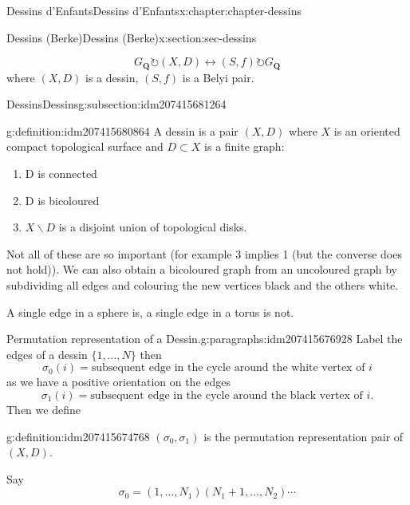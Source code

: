 \documentclass[oneside,10pt,]{book}
\numberwithin{equation}{section}
\newcommand{\QQ}{\mathbf{Q}}
\newcommand{\acts}{\circlearrowright}
\begin{document}
\begin{chapterptx}{Dessins d'Enfants}{}{Dessins d'Enfants}{}{}{x:chapter:chapter-dessins}
\begin{sectionptx}{Dessins (Berke)}{}{Dessins (Berke)}{}{}{x:section:sec-dessins}
\begin{introduction}{}%
%
\begin{equation*}
G_\QQ \acts (X,D) \leftrightarrow (S,f) \acts G_\QQ
\end{equation*}
where \((X,D)\) is a dessin, \((S,f)\) is a Belyi pair.%
\end{introduction}%
%
%
\typeout{************************************************}
\typeout{************************************************}
%
\begin{subsectionptx}{Dessins}{}{Dessins}{}{}{g:subsection:idm207415681264}
\begin{definition}{}{g:definition:idm207415680864}%
A dessin is  a pair \((X,D)\) where \(X\) is an oriented compact topological surface and \(D\subset X\) is a finite graph:%
\begin{enumerate}
\item{}D is connected%
\item{}D is bicoloured%
\item{}\(X \smallsetminus D\) is a disjoint union of topological disks.%
\end{enumerate}
%
\end{definition}
Not all of these are so important (for example 3 implies 1 (but the converse does not hold)). We can also obtain a bicoloured graph from an uncoloured graph by subdividing all edges and colouring the new vertices black and the others white.%
\par
A single edge in a sphere is, a single edge in a torus is not.%
\begin{paragraphs}{Permutation representation of a Dessin.}{g:paragraphs:idm207415676928}%
Label the edges of  a dessin \(\{1, \ldots, N\}\) then%
\begin{equation*}
\sigma_0(i) = \text{subsequent edge in the cycle around the white vertex of }i
\end{equation*}
as we have a positive orientation on the edges%
\begin{equation*}
\sigma_1(i) = \text{subsequent edge in the cycle around the black vertex of }i\text{.}
\end{equation*}
Then we define%
\begin{definition}{}{g:definition:idm207415674768}%
\((\sigma_0, \sigma_1)\) is the permutation representation pair of \((X,D)\).%
\end{definition}
Say%
\begin{equation*}
\sigma_0 = (1 , \ldots, N_1) (N_1 + 1 , \ldots, N_2)\cdots
\end{equation*}

\end{paragraphs}
\end{subsectionptx}
\end{sectionptx}
\end{chapterptx}
\end{document}
